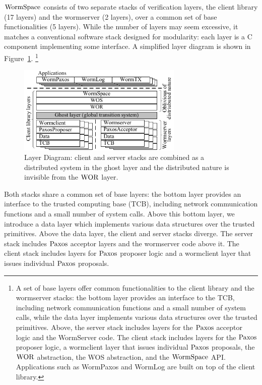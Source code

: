 $\mathrm{WormSpace}$ consists of two separate stacks of verification layers, the client library (17 layers) and the wormserver (2 layers), over a common set of base functionalities (5 layers). While the number of layers may seem excessive, it matches a conventional software stack designed for modularity: each layer is a C component implementing some interface. A simplified layer diagram is shown in Figure~\ref{fig:chapter:multipaxos:layerdiagram}.
\footnote{A set of base layers offer common functionalities to the client library and the wormserver stacks: 
the bottom layer provides an interface to the TCB, including network communication functions and a small number of system calls, 
while the data layer implements various data structures over the trusted primitives.
Above, the server stack includes layers for the $\mathrm{Paxos}$ acceptor logic and the WormServer code. 
The client stack includes layers for the $\mathrm{Paxos}$ proposer logic, a wormclient layer that issues individual $\mathrm{Paxos}$ proposals, 
the $\mathrm{WOR}$ abstraction, the WOS abstraction, and the $\mathrm{WormSpace}$ API.
Applications such as WormPaxos and WormLog are built on top of the client library.}
\begin{figure}
\centering
\includegraphics[width=0.7\textwidth]{figs/multipaxos/layer_diagram.pdf}
\caption{Layer Diagram: client and server stacks are combined as a distributed system in the ghost layer and the distributed nature is invisible from the $\mathrm{WOR}$ layer.}
\label{fig:chapter:multipaxos:layerdiagram}
\end{figure}
Both stacks share a common set of base layers: 
the bottom layer provides an interface to the trusted computing base (TCB), 
including network communication functions and a small number of system calls. Above this bottom layer, 
we introduce a data layer which implements various data structures over the trusted primitives. 
Above the data layer, the client and server stacks diverge. 
The server stack includes $\mathrm{Paxos}$ acceptor layers and the wormserver code above it.
The client stack includes layers for $\mathrm{Paxos}$ proposer logic and a wormclient layer that issues individual $\mathrm{Paxos}$ proposals.

